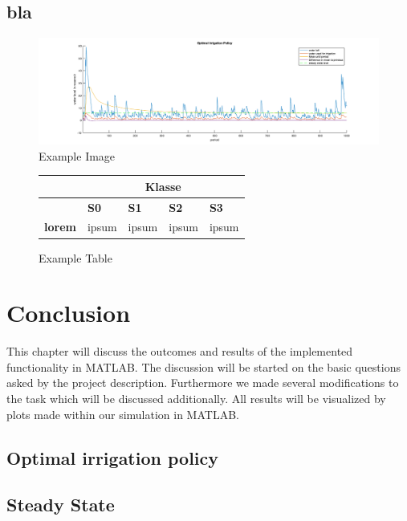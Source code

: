 \documentclass[12pt, a4paper, oneside]{article}
\begin{document}
	\subsection{bla}
	\begin{figure}[ht] %
		\includegraphics[width=1\textwidth]{figures/example.png}
		\caption{Example Image}
		\label{fig:example-pic}
	\end{figure}
	\blindtext
	\begin{figure}[ht] %
		\begin{longtable}{|p{2,5cm}|p{}|p{}|p{3cm}|p{3cm}|}
			\hline
			&\multicolumn{4}{c|}{\textbf{Klasse}} \\
			\hline
			& \textbf{S0} & \textbf{S1} & \textbf{S2} & \textbf{S3} \\
			\hline
			\textbf{lorem} & ipsum & ipsum & ipsum & ipsum \\
			\hline
		\end{longtable}
		\label{fig:example-figure}
		\caption{Example Table}
	\end{figure}
	\blindtext
	\blindtext
	\blindtext
	
	
	\section{Conclusion}
	This chapter will discuss the outcomes and results of the implemented functionality in MATLAB.
	The discussion will be started on the basic questions asked by the project description.
	Furthermore we made several modifications to the task which will be discussed additionally.
	All results will be visualized by plots made within our simulation in MATLAB.
	\subsection{Optimal irrigation policy}
	\subsection{Steady State}
\end{document}
